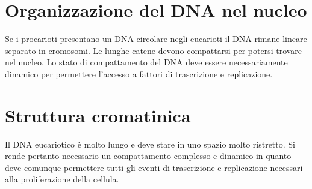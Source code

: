\section{Organizzazione del DNA nel nucleo}
Se i procarioti presentano un DNA circolare negli eucarioti il DNA rimane lineare separato in cromosomi. Le lunghe catene devono compattarsi per potersi trovare nel nucleo. Lo stato
di compattamento del DNA deve essere necessariamente dinamico per permettere l'accesso a fattori di trascrizione e replicazione. 





\section{Struttura cromatinica}
Il DNA eucariotico \`e molto lungo e deve stare in uno spazio molto ristretto. Si rende pertanto necessario un compattamento complesso e dinamico in quanto deve comunque permettere 
tutti gli eventi di trascrizione e replicazione necessari alla proliferazione della cellula. 







